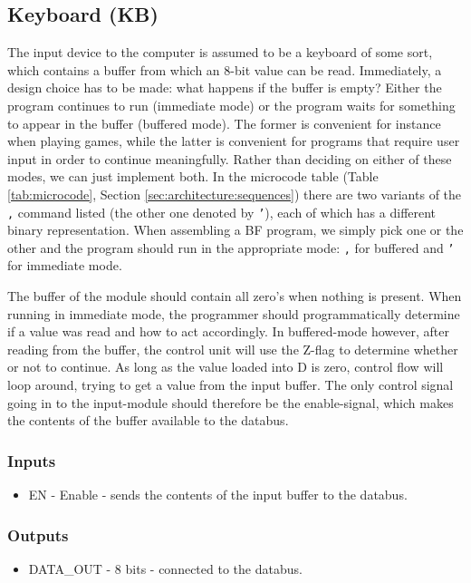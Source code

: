 \subsection{Keyboard (KB)} \label{sec:architecture:kb}
The input device to the computer is assumed to be a keyboard of some sort, which contains a buffer from which an 8-bit value can be read. Immediately, a design choice has to be made: what happens if the buffer is empty? Either the program continues to run (immediate mode) or the program waits for something to appear in the buffer (buffered mode). The former is convenient for instance when playing games, while the latter is convenient for programs that require user input in order to continue meaningfully. Rather than deciding on either of these modes, we can just implement both. In the microcode table (Table \ref{tab:microcode}, Section \ref{sec:architecture:sequences}) there are two variants of the \texttt{,} command listed (the other one denoted by \texttt{'}), each of which has a different binary representation. When assembling a BF program, we simply pick one or the other and the program should run in the appropriate mode: \texttt{,} for buffered and \texttt{'} for immediate mode.

The buffer of the module should contain all zero's when nothing is present. When running in immediate mode, the programmer should programmatically determine if a value was read and how to act accordingly. In buffered-mode however, after reading from the buffer, the control unit will use the Z-flag to determine whether or not to continue. As long as the value loaded into D is zero, control flow will loop around, trying to get a value from the input buffer. The only control signal going in to the input-module should therefore be the enable-signal, which makes the contents of the buffer available to the databus.

\subsubsection*{Inputs}
\begin{itemize}
\item EN - Enable - sends the contents of the input buffer to the databus.
\end{itemize}

\subsubsection*{Outputs}
\begin{itemize}
\item DATA\_OUT - 8 bits - connected to the databus.
\end{itemize}

